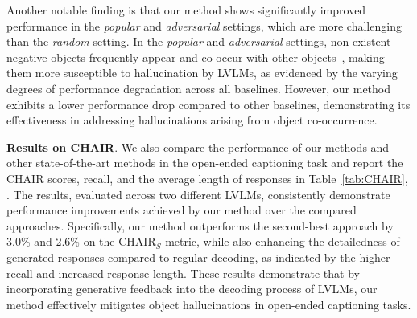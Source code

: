 Another notable finding is that our method shows significantly improved performance in the \textit{popular} and \textit{adversarial} settings, which are more challenging than the \textit{random} setting. In the \textit{popular} and \textit{adversarial} settings, non-existent negative objects frequently appear and co-occur with other objects~\citep{li2023evaluating}, making them more susceptible to hallucination by LVLMs, as evidenced by the varying degrees of performance degradation across all baselines. However, our method exhibits a lower performance drop compared to other baselines, demonstrating its effectiveness in addressing hallucinations arising from object co-occurrence.





\textbf{Results on CHAIR}. We also compare the performance of our methods and other state-of-the-art methods in the open-ended captioning task and report the CHAIR scores, recall, and the average length of responses in Table~\ref{tab:CHAIR}, . The results, evaluated across two different LVLMs, consistently demonstrate performance improvements achieved by our method over the compared approaches. Specifically, our method outperforms the second-best approach by 3.0\% and 2.6\% on the CHAIR$_S$ metric, while also enhancing the detailedness of generated responses compared to regular decoding, as indicated by the higher recall and increased response length.
These results demonstrate that by incorporating generative feedback into the decoding process of LVLMs, our method effectively mitigates object hallucinations in open-ended captioning tasks.



